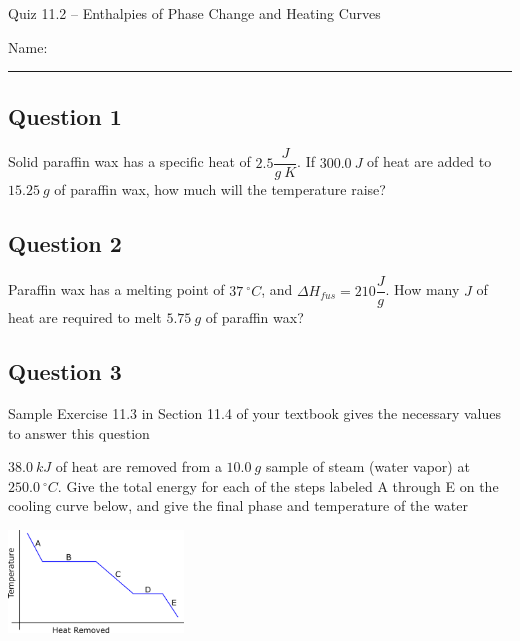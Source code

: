 \documentclass[11pt, letterpaper]{memoir}
\begin{document}
	\begin{center}
		{\large	Quiz 11.2 -- Enthalpies of Phase Change and Heating Curves}
	\end{center}
	{\large Name: \rule[-1mm]{4in}{.1pt} 
		
	\subsection*{Question 1}
	Solid paraffin wax has a specific heat of $2.5\dfrac{J}{g~K}$. If $300.0~J$ of heat are added to $15.25~g$ of paraffin wax, how much will the temperature raise?
	
	\vspace{4.5em}
	\subsection*{Question 2}
	Paraffin wax has a melting point of $37~^\circ C$, and $\Delta H_{fus}=210\dfrac{J}{g}$. How many $J$ of heat are required to melt $5.75~g$ of paraffin wax?
	
	\vspace{4.5em}
	\subsection*{Question 3}
	Sample Exercise 11.3 in Section 11.4 of your textbook gives the necessary values to answer this question
	
	\noindent $38.0~kJ$ of heat are removed from a $10.0~g$ sample of steam (water vapor) at $250.0~^\circ C$. Give the total energy for each of the steps labeled A through E on the cooling curve below, and give the final phase and temperature of the water
	
	
	
	\vspace{12em} 
	\hspace{-3em}\includegraphics[width=0.35\textwidth]{Cooling_Curve}
	
	\newpage
	\pagestyle{empty}
	\addtocounter{page}{-1}
}
\end{document}

